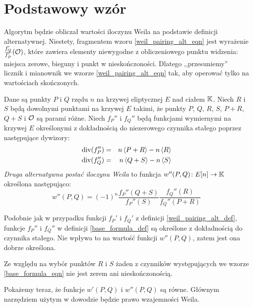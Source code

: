 \section{Podstawowy wzór}

\noindent
Algorytm będzie obliczał wartości iloczynu Weila
na podstawie definicji alternatywnej.
Niestety, fragmentem wzoru \ref{weil_pairing_alt_eqn}
jest wyrażenie $\frac{f_Q'}{f_P'}(\mathcal{O})$,
które zawiera elementy niewygodne z obliczeniowego punktu widzenia:
miejsca zerowe, bieguny i punkt w nieskończoności.
Dlatego ,,przesuniemy'' licznik i mianownik
we wzorze \ref{weil_pairing_alt_eqn} tak,
aby operować tylko na wartościach skończonych.

\begin{definition}\label{base_formula_def}
Dane są punkty $P$ i $Q$ rzędu $n$ na krzywej eliptycznej $E$ nad ciałem $\mathbb{K}$.
Niech $R$ i $S$ będą dowolnymi punktami na krzywej $E$ takimi,
że punkty $P$, $Q$, $R$, $S$, $P+R$, $Q+S$ i $\mathcal{O}$ są parami różne.
Niech $f_P''$ i $f_Q''$ będą funkcjami wymiernymi na krzywej $E$
określonymi z dokładnością do niezerowego czynnika stałego
poprzez następujące dywizory:
\begin{eqnarray*}
\operatorname{div}(f_P'') & = & n\left\langle P+R\right\rangle - n\left\langle R\right\rangle \\
\operatorname{div}(f_Q'') & = & n\left\langle Q+S\right\rangle - n\left\langle S\right\rangle
\end{eqnarray*}
\emph{Druga alternatywna postać iloczynu Weila}
to funkcja $w''(P, Q)\colon E[n] \to \mathbb{K}$
określona następująco:
\begin{equation}\label{base_formula_eqn}
w''(P, Q) = (-1)^n\frac{f_P''(Q+S)}{f_P''(S)}\frac{f_Q''(R)}{f_Q''(P+R)}
\end{equation}
\end{definition}

\begin{remark}
Podobnie jak w przypadku funkcji
$f_P'$ i $f_Q'$ z definicji \ref{weil_pairing_alt_def},
funkcje $f_P''$ i $f_Q''$ w definicji \ref{base_formula_def}
są określone z dokładnością do czynnika stałego.
Nie wpływa to na wartość funkcji $w''(P, Q)$,
zatem jest ona dobrze określona.
\end{remark}

\begin{remark}
Ze względu na wybór punktów $R$ i $S$
żaden z czynników występujących we wzorze \ref{base_formula_eqn}
nie jest zerem ani nieskończonością.
\end{remark}

\noindent
Pokażemy teraz, że funkcje $w'(P, Q)$ i $w''(P, Q)$ są równe.
Głównym narzędziem użytym w dowodzie będzie prawo wzajemności Weila.

